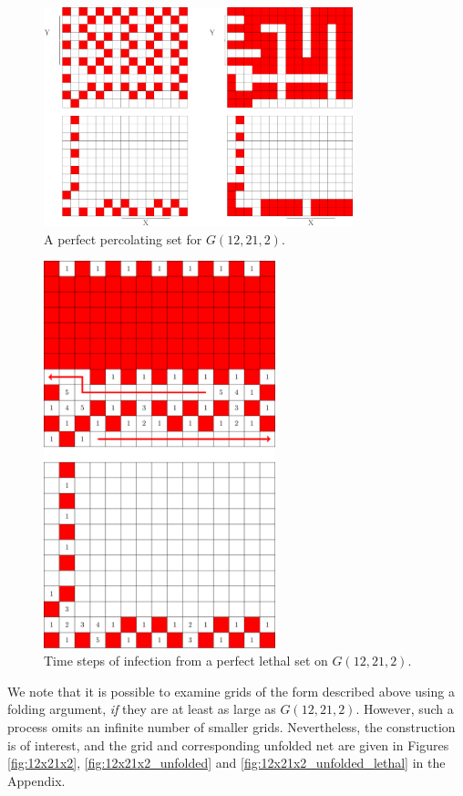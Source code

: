 \begin{figure}[]
\centering
\includegraphics[width=0.8\textwidth]{figures/7/12x15x2.pdf}
\caption{A perfect percolating set for $G(12,21,2)$.}
\label{fig:12x15x2}
\end{figure} 

\begin{figure}[]
\centering
\includegraphics[width=0.6\textwidth]{figures/7/12x15x2_L1_numbered_heatmap.pdf}
\caption{Time steps of infection from a perfect lethal set on $G(12,21,2)$.}
\label{fig:12x15x2_L1}
\end{figure} 

We note that it is possible to examine grids of the form described above using a folding argument, \emph{if} they are at least as large as $G(12,21,2)$. However, such a process omits an infinite number of smaller grids. Nevertheless, the construction is of interest, and the grid and corresponding unfolded net are given in Figures \ref{fig:12x21x2}, \ref{fig:12x21x2_unfolded} and \ref{fig:12x21x2_unfolded_lethal} in the Appendix. 

